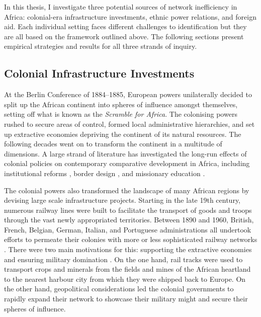 \documentclass[11pt, oneside]{article}   	%
\begin{document}
In this thesis, I investigate three potential sources of network inefficiency in Africa: colonial-era infrastructure investments, ethnic power relations, and foreign aid. Each individual setting faces different challenges to identification but they are all based on the framework outlined above. The following sections present empirical strategies and results for all three strands of inquiry.

\subsection{Colonial Infrastructure Investments}
At the Berlin Conference of 1884--1885, European powers unilaterally decided to split up the African continent into spheres of influence amongst themselves, setting off what is known as the \emph{Scramble for Africa}. The colonising powers rushed to secure areas of control, formed local administrative hierarchies, and set up extractive economies depriving the continent of its natural resources. The following decades went on to transform the continent in a multitude of dimensions. A large strand of literature has investigated the long-run effects of colonial policies on contemporary comparative development in Africa, including institutional reforms \citep{Acemoglu_ColonialOriginsComparative_2001,acemoglu_reversal_2002}, border design \citep{michalopoulos_long-run_2016}, and missionary education \citep{Wantchekon_EducationHumanCapital_2015}.

The colonial powers also transformed the landscape of many African regions by devising large scale infrastructure projects. Starting in the late 19th century, numerous railway lines were built to facilitate the transport of goods and troops through the vast newly appropriated territories. Between 1890 and 1960, British, French, Belgian, German, Italian, and Portuguese administrations all undertook efforts to permeate their colonies with more or less sophisticated railway networks \citep{jedwab_permanent_2016}. There were two main motivations for this: supporting the extractive economies and ensuring military domination \citep{jedwab_history_2017}. On the one hand, rail tracks were used to transport crops and minerals from the fields and mines of the African heartland to the nearest harbour city from which they were shipped back to Europe. On the other hand, geopolitical considerations led the colonial governments to rapidly expand their network to showcase their military might and secure their spheres of influence.
\end{document}
